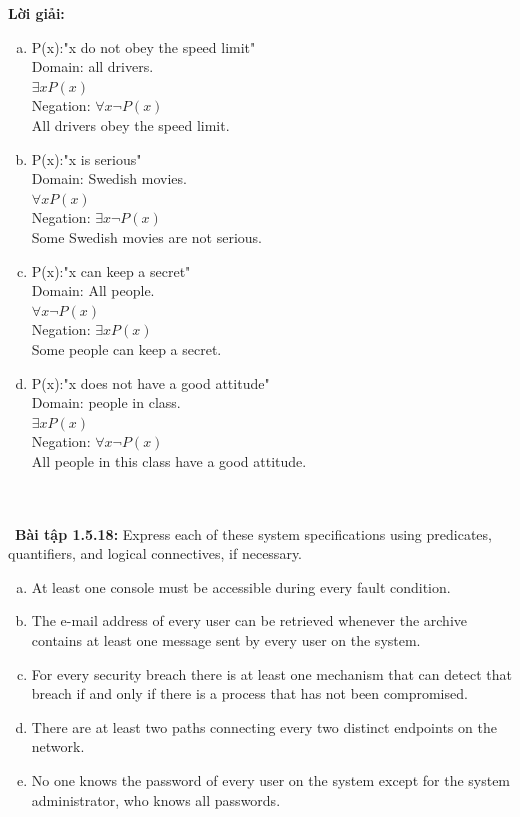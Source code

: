 \documentclass[a4paper]{article}
\begin{document}
\textbf{Lời giải:} \begin{enumerate}[a)]
\item P(x):"x do not obey the speed limit"\\
Domain: all drivers.\\
$\exists x P(x)$\\
Negation: $\forall x \lnot P(x)$\\
All drivers obey the speed limit.
\item P(x):"x is serious"\\
Domain: Swedish movies.\\
$\forall x P(x)$\\
Negation: $\exists x \lnot P(x)$\\
Some Swedish movies are not serious.
\item P(x):"x can keep a secret"\\
Domain: All people.\\
$\forall x \lnot P(x)$\\
Negation: $\exists x P(x)$\\
Some people can keep a secret.
\item P(x):"x does not have a good attitude"\\
Domain: people in class.\\
$\exists x P(x)$\\
Negation: $\forall x \lnot P(x)$\\
All people in this class have a good attitude.
\end{enumerate}  \\\ \\\
\textbf{Bài tập 1.5.18: }Express each of these system specifications using predicates, quantifiers, and logical connectives, if necessary.
\begin{enumerate}[a)]
\item At least one console must be accessible during every
fault condition.
\item The e-mail address of every user can be retrieved
whenever the archive contains at least one message sent by every user on the system.
\item For every security breach there is at least one mechanism that can detect that breach if and only if there is a process that has not been compromised.
\item There are at least two paths connecting every two distinct endpoints on the network.
\item No one knows the password of every user on the system except for the system administrator, who knows
all passwords.
\end{enumerate}
\end{document}
